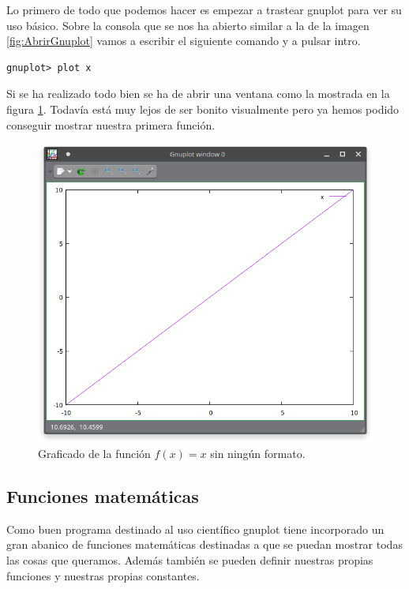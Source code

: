 \documentclass[11pt,a4paper,twoside,pdf]{article}
\numberwithin{equation}{section}
\begin{document}
Lo primero de todo que podemos hacer es empezar a trastear gnuplot para ver su uso básico. Sobre la consola que se nos ha abierto similar a la de la imagen \ref{fig:AbrirGnuplot} vamos a escribir el siguiente comando y a pulsar intro.

\begin{lstlisting}[language=Gnuplot]
gnuplot> plot x
\end{lstlisting}

Si se ha realizado todo bien se ha de abrir una ventana como la mostrada en la figura \ref{fig:plot_x_without}. Todavía está muy lejos de ser bonito visualmente pero ya hemos podido conseguir mostrar nuestra primera función.

\begin{figure}[!h]
    \centering
    \includegraphics[scale=0.4]{Capturas/01_PrimerPlot.png}
    \caption{Graficado de la función $f(x) = x$ sin ningún formato.}
    \label{fig:plot_x_without}
\end{figure}


\subsection{Funciones matemáticas}

Como buen programa destinado al uso científico gnuplot tiene incorporado un gran abanico de funciones matemáticas destinadas a que se puedan mostrar todas las cosas que queramos. Además también se pueden definir nuestras propias funciones y nuestras propias constantes. \\
\end{document}

